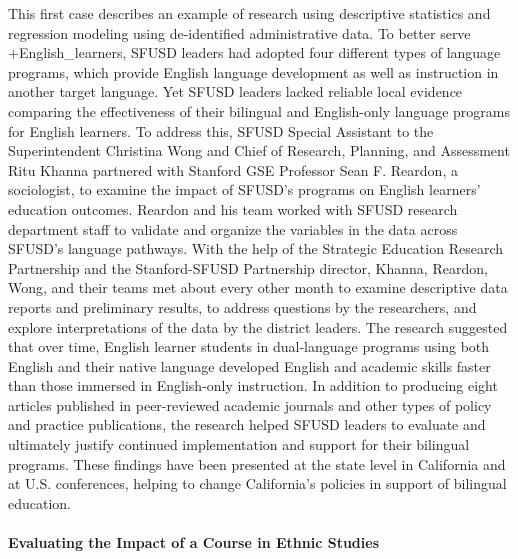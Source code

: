 \documentclass[
]{WileySix}
\begin{document}
This first case describes an example of research using descriptive statistics and regression modeling using de-identified administrative data. To better serve +English\_learners\textbar, SFUSD leaders had adopted four different types of language programs, which provide English language development as well as instruction in another target language. Yet SFUSD leaders lacked reliable local evidence comparing the effectiveness of their bilingual and English-only language programs for English learners. To address this, SFUSD Special Assistant to the Superintendent Christina Wong and Chief of Research, Planning, and Assessment Ritu Khanna partnered with Stanford GSE Professor Sean F. Reardon, a sociologist, to examine the impact of SFUSD's programs on English learners' education outcomes. Reardon and his team worked with SFUSD research department staff to validate and organize the variables in the data across SFUSD's language pathways. With the help of the Strategic Education Research Partnership and the Stanford-SFUSD Partnership director, Khanna, Reardon, Wong, and their teams met about every other month to examine descriptive data reports and preliminary results, to address questions by the researchers, and explore interpretations of the data by the district leaders. The research suggested that over time, English learner students in dual-language programs using both English and their native language developed English and academic skills faster than those immersed in English-only instruction. In addition to producing eight articles published in peer-reviewed academic journals and other types of policy and practice publications, the research helped SFUSD leaders to evaluate and ultimately justify continued implementation and support for their bilingual programs. These findings have been presented at the state level in California and at U.S. conferences, helping to change California's policies in support of bilingual education.

\hypertarget{evaluating-the-impact-of-a-course-in-ethnic-studies}{%
\paragraph{Evaluating the Impact of a Course in Ethnic Studies}\label{evaluating-the-impact-of-a-course-in-ethnic-studies}}
\end{document}
